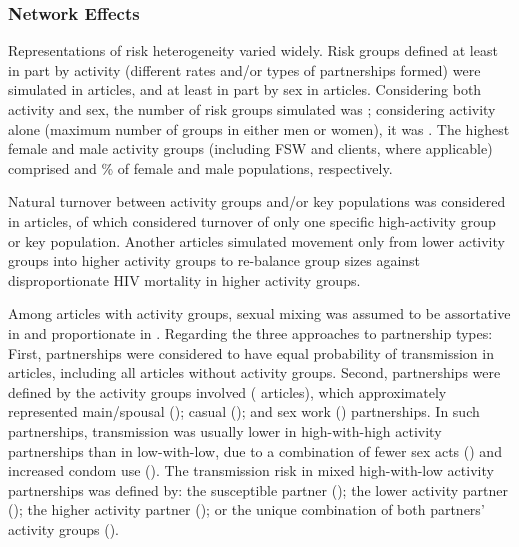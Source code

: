 \subsubsection{Network Effects}
\label{sss:res:network}
Representations of risk heterogeneity varied widely.
Risk groups defined at least in part by activity
(different rates and/or types of partnerships formed) were simulated in  articles,
and at least in part by sex in  articles.
Considering both activity and sex, the number of risk groups simulated was ;
considering activity alone (maximum number of groups in either men or women), it was .
The highest female and male activity groups (including FSW and clients, where applicable) comprised
 and  \% of female and male populations, respectively.
\par
Natural turnover between activity groups and/or key populations
was considered in  articles,
of which  considered turnover of only
one specific high-activity group or key population.
Another  articles simulated
movement only from lower activity groups into higher activity groups
to re-balance group sizes against disproportionate HIV mortality in higher activity groups.
\par
Among  articles with activity groups, sexual mixing was assumed to be
assortative in  and proportionate in .
Regarding the three approaches to partnership types:
First, partnerships were considered to have equal probability of transmission in
 articles, including all articles without activity groups.
Second, partnerships were defined by the activity groups involved ( articles),
which approximately represented
main/spousal ();
casual (); and
sex work () partnerships.
In such partnerships, transmission was usually
lower in high-with-high activity partnerships than in low-with-low, due to a combination of
fewer sex acts () and
increased condom use ().
The transmission risk in mixed high-with-low activity partnerships was defined by:
the susceptible partner ();
the lower activity partner ();
the higher activity partner (); or
the unique combination of both partners' activity groups ().
